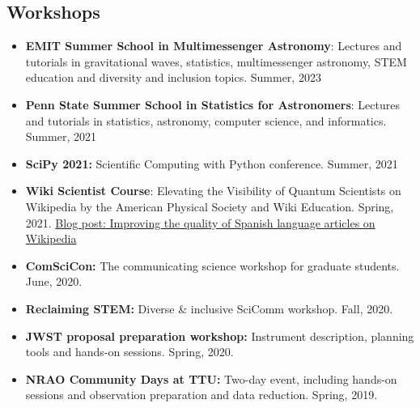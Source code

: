 \documentclass[letterpaper,10pt]{article}
\begin{document}
\subsection*{Workshops}
\begin{itemize}[label=$\blacktriangleright$]



\item \textbf{EMIT Summer School in Multimessenger Astronomy}: Lectures and tutorials in gravitational waves, statistics, multimessenger astronomy, STEM education and diversity and inclusion topics. Summer, 2023

\item \textbf{Penn State Summer School in Statistics for Astronomers}: Lectures and tutorials in statistics, astronomy, computer science, and informatics. Summer, 2021

\item \textbf{SciPy 2021:} Scientific Computing with Python conference. Summer, 2021
    \item  \textbf{Wiki Scientist Course}: Elevating the Visibility of Quantum Scientists on Wikipedia by the American Physical Society and Wiki Education. Spring, 2021. \href{https://wikiedu.org/blog/2021/05/24/improving-the-quality-of-spanish-language-articles-on-wikipedia/}{Blog post: Improving the quality of Spanish language articles on Wikipedia}
    \item \textbf{ComSciCon:} The communicating science workshop for graduate students. June, 2020.
    \item \textbf{Reclaiming STEM:} Diverse \& inclusive SciComm workshop. Fall, 2020.
    
            \item \textbf{JWST proposal preparation workshop:}  Instrument description, planning tools and hands-on sessions. Spring, 2020.

    
    
    
        \item \textbf{NRAO Community Days at TTU:}  Two-day event, including  hands-on sessions and observation preparation and data reduction. Spring, 2019.


\end{itemize}
\end{document}
